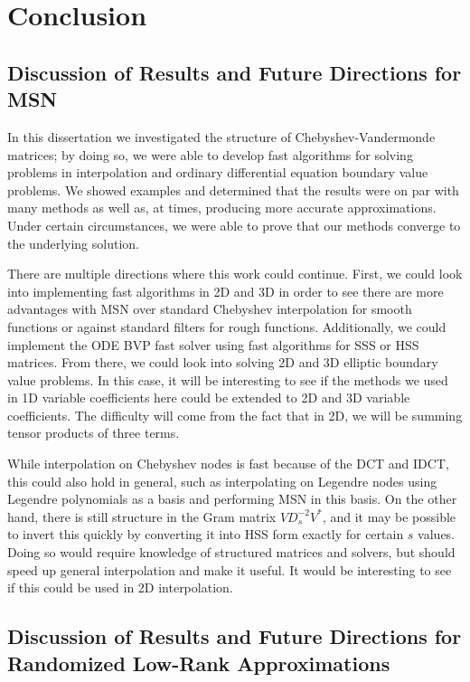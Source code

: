 \chapter{Conclusion}
\label{chap:conclusion}

\section{Discussion of Results and Future Directions for MSN}

In this dissertation we investigated the structure of 
Chebyshev-Vandermonde matrices; by doing so, we were
able to develop fast algorithms for solving problems
in interpolation and ordinary differential equation boundary value problems.
We showed examples and determined that the results were on par
with many methods as well as, at times, producing more accurate approximations.
Under certain circumstances, we were able to prove that our methods
converge to the underlying solution.

There are multiple directions where this work could continue.
First, we could look into implementing fast algorithms
in 2D and 3D in order to see there are more advantages with
MSN over standard Chebyshev interpolation for smooth functions
or against standard filters for rough functions.
Additionally, we could implement the ODE BVP fast solver
using fast algorithms for SSS or HSS matrices.
From there, we could look into solving 2D and 3D elliptic
boundary value problems.
In this case, it will be interesting to see if the methods we used in
1D variable coefficients here could be extended to 2D and 3D
variable coefficients.
The difficulty will come from the fact that in 2D, we will be summing
tensor products of three terms.

While interpolation on Chebyshev nodes is fast because of the DCT
and IDCT, this could also hold in general, such as interpolating
on Legendre nodes using Legendre polynomials as a basis and
performing MSN in this basis.
On the other hand, there is still structure in the Gram matrix
$VD_{s}^{-2}V^{*}$, and it may be possible to invert this quickly
by converting it into HSS form exactly for certain $s$ values.
Doing so would require knowledge of structured matrices and solvers,
but should speed up general interpolation and make it useful.
It would be interesting to see if this could be used in
2D interpolation.



\section{Discussion of Results and Future Directions for
Randomized Low-Rank Approximations}

